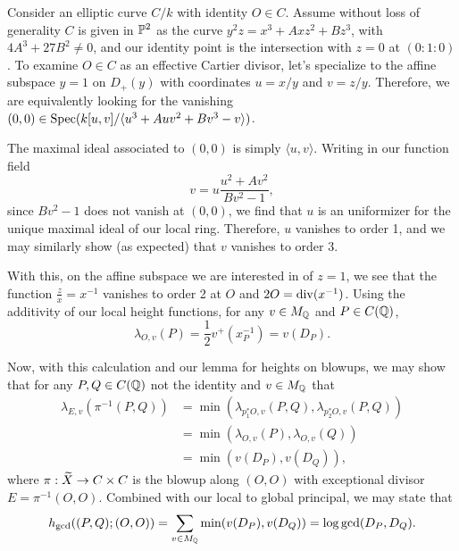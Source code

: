 \begin{example}
    Consider an elliptic curve $C/k$ with identity $O \in C$.
    Assume without loss of generality $C$ is given in $\mathbb{P}^2$ as the curve $y^2z = x^3 + Axz^2 + Bz^3$,
    with $4A^3 + 27B^2 \neq 0$, and our identity point is the intersection with $z = 0$ at $(0 : 1 : 0)$.
    To examine $O \in C$ as an effective Cartier divisor,
    let's specialize to the affine subspace $y = 1$ on $D_+(y)$ with coordinates $u = x/y$ and $v = z/y$.
    Therefore, we are equivalently looking for the vanishing $(0, 0) \in {\rm Spec}(k[u,v]/\langle u^3 + Auv^2 + Bv^3 - v \rangle)$.

    The maximal ideal associated to $(0, 0)$ is simply $\langle u, v \rangle$.
    Writing in our function field
    \[
    v = u \frac{u^2 + Av^2}{Bv^2 - 1},
    \]
    since $Bv^2 - 1$ does not vanish at $(0, 0)$,
    we find that $u$ is an uniformizer for the unique maximal ideal of our local ring.
    Therefore, $u$ vanishes to order 1, and we may similarly show (as expected) that $v$ vanishes to order 3.
    
    With this, on the affine subspace we are interested in of $z = 1$,
    we see that the function $\frac{z}{x} = x^{-1}$ vanishes to order 2 at $O$ and $2O = {\rm div}(x^{-1})$.
    Using the additivity of our local height functions, 
    for any $v \in M_{\mathbb{Q}}$ and $P \in C(\mathbb{Q})$,
    \[
        \lambda_{O, v}(P) = \frac{1}{2} v^+(x_P^{-1}) = v(D_P).
    \]

    Now, with this calculation and our lemma for heights on blowups,
    we may show that for any $P, Q \in C(\mathbb{Q})$ not the identity and $v \in M_{\mathbb{Q}}$ that
    \begin{align*}
        \lambda_{E, v}(\pi^{-1}(P, Q))
        & = \min(\lambda_{p_1^*O, v}(P, Q), \lambda_{p_2^*O, v}(P, Q)) \\
        & = \min(\lambda_{O, v}(P), \lambda_{O,v}(Q)) \\
        & = \min(v(D_P), v(D_Q)),
    \end{align*}
    where $\pi : \widetilde X \to C \times C$ is the blowup along $(O, O)$ with exceptional divisor $E = \pi^{-1}(O, O)$.
    Combined with our local to global principal, we may state that
    \begin{align*}
        h_{\gcd}((P, Q); (O, O)) 
        = \sum_{v \in M_{\mathbb{Q}}} \min(v(D_P), v(D_Q))
        = \log \gcd (D_P, D_Q).
    \end{align*}
\end{example}